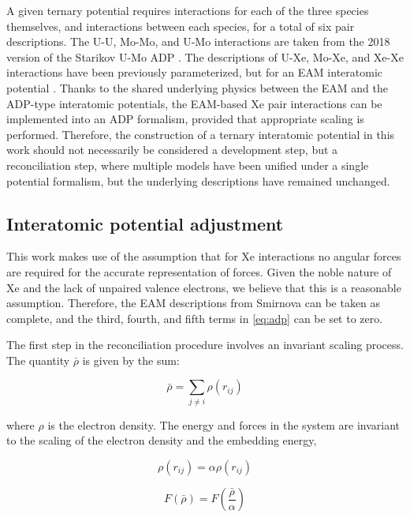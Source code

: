 \documentclass[review]{elsarticle}
\begin{document}
A given ternary potential requires interactions for each of the three species themselves, and interactions between each species, for a total of six pair descriptions. The U-U, Mo-Mo, and U-Mo interactions are taken from the 2018 version of the Starikov U-Mo ADP \cite{starikov2018}. The descriptions of U-Xe, Mo-Xe, and Xe-Xe interactions have been previously parameterized, but for an EAM interatomic potential \cite{smirnovaUMoXe}. Thanks to the shared underlying physics between the EAM and the ADP-type interatomic potentials, the EAM-based Xe pair interactions can be implemented into an ADP formalism, provided that appropriate scaling is performed. Therefore, the construction of a ternary interatomic potential in this work should not necessarily be considered a development step, but a reconciliation step, where multiple models have been unified under a single potential formalism, but the underlying descriptions have remained unchanged. 

 \subsection{Interatomic potential adjustment}

This work makes use of the assumption that for Xe interactions no angular forces are required for the accurate representation of forces. Given the noble nature of Xe and the lack of unpaired valence electrons, we believe that this is a reasonable assumption. Therefore, the EAM descriptions from Smirnova \cite{smirnovaUMoXe} can be taken as complete, and the third, fourth, and fifth terms in \cref{eq:adp} can be set to zero. 

The first step in the reconciliation procedure involves an invariant scaling process. The quantity $\bar{\rho}$ is given by the sum:

\begin{equation}
\bar{\rho} = \sum_{j \neq i} \rho(r_{ij})
\end{equation}

\noindent where $\rho$ is the electron density. The energy and forces in the system are invariant to the scaling of the electron density and the embedding energy,

\begin{equation}
\rho(r_{ij}) = \alpha\rho(r_{ij})
\end{equation}

\begin{equation}
F(\bar{\rho}) = F(\frac{\bar{\rho}}{\alpha}) 
\end{equation}
\end{document}
